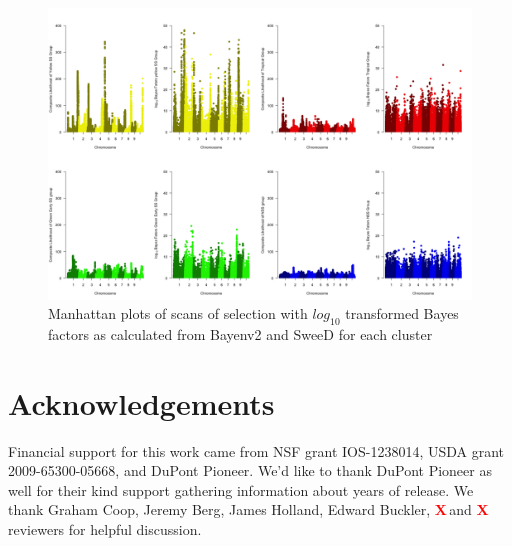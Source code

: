 \documentclass[9pt,twocolumn,twoside]{gsajnl}
\newcommand{\X}{\textcolor{red}{\bf X\,}}
\begin{document}
\begin{figure}[htbp]
\centering
\includegraphics[width=\linewidth]{manhattan_mania.png}
\caption{Manhattan plots of scans of selection with $log_10$ transformed Bayes factors as calculated from Bayenv2 and SweeD for each cluster
}
\label{fig:manhattan}
\end{figure}


\section*{Acknowledgements}
Financial support for this work came from NSF grant IOS-1238014, USDA grant 2009-65300-05668, and DuPont Pioneer.  We'd like to thank DuPont Pioneer as well for their kind support gathering information about years of release. We thank Graham Coop, Jeremy Berg, James Holland, Edward Buckler, \X and \X reviewers for helpful discussion. 


\end{document}
